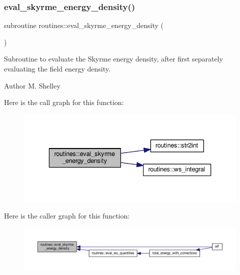 \subsubsection{\texorpdfstring{eval\+\_\+skyrme\+\_\+energy\+\_\+density()}{eval\_skyrme\_energy\_density()}}
{\footnotesize\ttfamily subroutine routines\+::eval\+\_\+skyrme\+\_\+energy\+\_\+density (\begin{DoxyParamCaption}{ }\end{DoxyParamCaption})}



Subroutine to evaluate the Skyrme energy density, after first separately evaluating the field energy density. 

\begin{DoxyAuthor}{Author}
M. Shelley 
\end{DoxyAuthor}
Here is the call graph for this function\+:
\nopagebreak
\begin{figure}[H]
\begin{center}
\leavevmode
\includegraphics[width=336pt]{namespaceroutines_ae210968d134fbcc79297971cc4fefb82_cgraph}
\end{center}
\end{figure}
Here is the caller graph for this function\+:
\nopagebreak
\begin{figure}[H]
\begin{center}
\leavevmode
\includegraphics[width=350pt]{namespaceroutines_ae210968d134fbcc79297971cc4fefb82_icgraph}
\end{center}
\end{figure}
\mbox{\label{namespaceroutines_a97bfcff7e603cf9df3dcd48ae21b4612}} 
